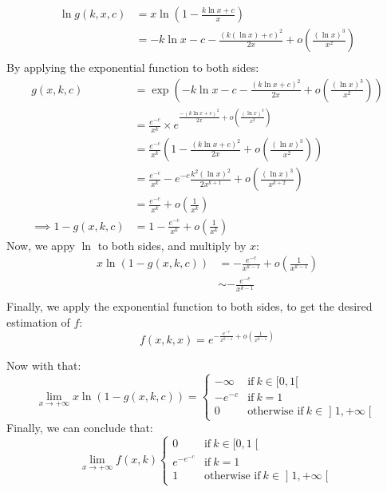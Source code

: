 \begin{align*}
	\ln g(k,x,c)&=x\ln\left(1-\frac{k\ln x+c}{x}\right)\\
	&=-k\ln x-c -\frac{(k(\ln x)+c)^2}{2x}+o\left(\frac{(\ln x)^3}{x^2}\right)\\
\end{align*}
By applying the exponential function to both sides:
\begin{align*}
	g(x,k,c)&=\exp\left(-k\ln x-c -\frac{(k\ln x+c)^2}{2x}+o\left(\frac{(\ln x)^3}{x^2}\right)\right) \\
	&=\frac{e^{-c}}{x^k}\times e^{\frac{-(k\ln x+c)^2}{2x}+o\left(\frac{(\ln x)^3}{x^2}\right)}\\
	&=\frac{e^{-c}}{x^k}\left(1-\frac{(k \ln x+c)^2}{2x}+o\left(\frac{(\ln x)^3}{x^2}\right)\right)  \\
	&=\frac{e^{-c}}{x^k}-e^{-c}\frac{k^2(\ln x)^2}{2x^{k+1}}+o\left(\frac{(\ln x)^3}{x^{k+2}}\right)\\
	&=\frac{e^{-c}}{x^k}+o\left(\frac{1}{x^k}\right)\\
	\implies 1- g(x,k,c)&=1-\frac{e^{-c}}{x^{k}} +o\left(\frac{1}{x^k}\right)
\end{align*}
Now, we appy $\ln$ to both sides, and multiply by $x:$ 
\begin{align*}
	x\ln(1-g(x,k,c))&= -\frac{e^{-c}}{x^{k-1}}+o\left(\frac{1}{x^{k-1}}\right) \\
	&\sim -\frac{e^{-c}}{x^{k-1}}  \\
\end{align*}
Finally, we apply the exponential function to both sides, to get the desired estimation of $f:$
\begin{equation}
	\label{eqn:SinklessAsymptotic}
	 f(x,k,x) = e^{-\frac{e^{-c}}{x^{k-1}}+o(\frac{1}{x^{k-1}})}
\end{equation}

Now with that:
$$
\lim_{x\rightarrow +\infty} x\ln (1-g(x,k,c))=\begin{cases}
	-\infty  & \text{if} \ k\in[0,1[ \\
	-e^{-c} & \text{if}\ k=1  \\
	0 & \text{otherwise if}\ k\in \mathopen]1,+\infty\mathclose[ 
\end{cases}
$$
Finally, we can conclude that:
\begin{equation}
	\label{eqn:SinklessProbabilityLimit}
	\lim_{x\rightarrow +\infty} f(x,k)\begin{cases}
		0  & \text{if} \ k\in \mathopen[0,1\mathclose[ \\
		e^{-e^{-c}} & \text{if}\ k=1  \\
		1 & \text{otherwise if}\ k\in \mathopen]1,+\infty\mathclose[ 
	\end{cases}
\end{equation}

